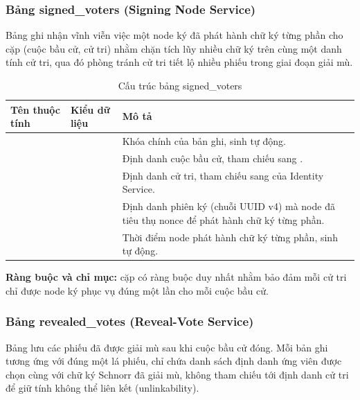 \subsubsection{Bảng {signed\_voters} (Signing Node Service)}

Bảng  ghi nhận vĩnh viễn việc một node ký đã phát hành chữ ký từng phần cho cặp (cuộc bầu cử, cử tri) nhằm chặn tích lũy nhiều chữ ký trên cùng một danh tính cử tri, qua đó phòng tránh cử tri tiết lộ nhiều phiếu trong giai đoạn giải mù.

\begin{table}[H]
    \centering
    \small
    \setlength{\tabcolsep}{3pt}
    \caption{Cấu trúc bảng {signed\_voters}}
    \label{tab:db-signed-voters}
    \begin{tabularx}{\textwidth}{|L{0.25}|L{0.25}|L{0.50}|}
    \hline
    \textbf{Tên thuộc tính} & \textbf{Kiểu dữ liệu} & \textbf{Mô tả} \\
    \hline
             &  & Khóa chính của bản ghi, sinh tự động. \\ \hline
     &  & Định danh cuộc bầu cử, tham chiếu sang . \\ \hline
        &  & Định danh cử tri, tham chiếu sang  của Identity Service. \\ \hline
      &    & Định danh phiên ký (chuỗi UUID v4) mà node đã tiêu thụ nonce để phát hành chữ ký từng phần. \\ \hline
       &  & Thời điểm node phát hành chữ ký từng phần, sinh tự động. \\ \hline
    \end{tabularx}
\end{table}

\textbf{Ràng buộc và chỉ mục:} cặp  có ràng buộc duy nhất nhằm bảo đảm mỗi cử tri chỉ được node ký phục vụ đúng một lần cho mỗi cuộc bầu cử.

\subsubsection{Bảng {revealed\_votes} (Reveal-Vote Service)}

Bảng  lưu các phiếu đã được giải mù sau khi cuộc bầu cử đóng. Mỗi bản ghi tương ứng với đúng một lá phiếu, chỉ chứa danh sách định danh ứng viên được chọn cùng với chữ ký Schnorr đã giải mù, không tham chiếu tới định danh cử tri để giữ tính không thể liên kết (unlinkability).

